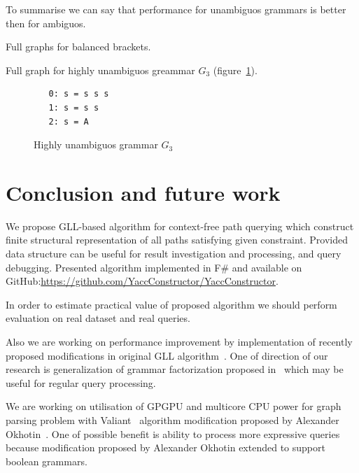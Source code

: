 \documentclass{sig-alternate} %
\begin{document}
To summarise we can say that performance for unambiguos grammars is better then for ambiguos. 

Full graphs for balanced brackets.

Full graph for highly unambiguos greammar $G_3$ (figure~\ref{grammarG3}).

\begin{figure}[h]
   \begin{center}
\begin{verbatim}
   0: s = s s s 
   1: s = s s
   2: s = A
\end{verbatim}
   \caption{Highly unambiguos grammar $G_3$}
   \label{grammarG3}        
   \end{center}
\end{figure}


\section{Conclusion and future work}
We propose GLL-based algorithm for context-free path querying which construct finite structural representation of all paths satisfying given constraint.
Provided data structure can be useful for result investigation and processing, and query debugging.
Presented algorithm implemented in F\# and available on GitHub:\url{https://github.com/YaccConstructor/YaccConstructor}.

In order to estimate practical value of proposed algorithm we should perform evaluation on real dataset and real queries.

Also we are working on performance improvement by implementation of recently proposed modifications in original GLL algorithm~\cite{FGLL}.
One of direction of our research is generalization of grammar factorization proposed in~\cite{FGLL} which may be useful for regular query processing.

We are working on utilisation of GPGPU and multicore CPU power for graph parsing problem with Valiant~\cite{valiantParsingWithMatrixMultiplication} algorithm modification proposed 
by Alexander Okhotin~\cite{okhotin2014parsingWithMatrixMultiplication}.
One of possible benefit is ability to process more expressive queries because modification proposed by Alexander Okhotin extended to support boolean grammars.





\end{document}
